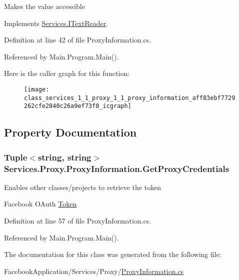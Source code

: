 Makes the value accessible 



Implements \hyperlink{interface_services_1_1_i_text_reader_a670edc32225de1bcaf9942b4acc1edaf}{Services.\+I\+Text\+Reader}.



Definition at line 42 of file Proxy\+Information.\+cs.



Referenced by Main.\+Program.\+Main().



Here is the caller graph for this function\+:
\nopagebreak
\begin{figure}[H]
\begin{center}
\leavevmode
\texttt{[image: class\_services\_1\_1\_proxy\_1\_1\_proxy\_information\_aff83ebf7729262cfe2840c26a9ef73f0\_icgraph]}
\end{center}
\end{figure}




\subsection{Property Documentation}
\subsubsection[{\texorpdfstring{Get\+Proxy\+Credentials}{GetProxyCredentials}}]{\setlength{\rightskip}{0pt plus 5cm}Tuple$<$string, string$>$ Services.\+Proxy.\+Proxy\+Information.\+Get\+Proxy\+Credentials\hspace{0.3cm}{\ttfamily [get]}}\hypertarget{class_services_1_1_proxy_1_1_proxy_information_a618dc0f74995fb57440293d34b4e7019}{}\label{class_services_1_1_proxy_1_1_proxy_information_a618dc0f74995fb57440293d34b4e7019}


Enables other classes/projects to retrieve the token 

Facebook O\+Auth \hyperlink{namespace_services_1_1_token}{Token}

Definition at line 57 of file Proxy\+Information.\+cs.



Referenced by Main.\+Program.\+Main().



The documentation for this class was generated from the following file\+:\begin{DoxyCompactItemize}
\item 
Facebook\+Application/\+Services/\+Proxy/\hyperlink{_proxy_information_8cs}{Proxy\+Information.\+cs}\end{DoxyCompactItemize}
